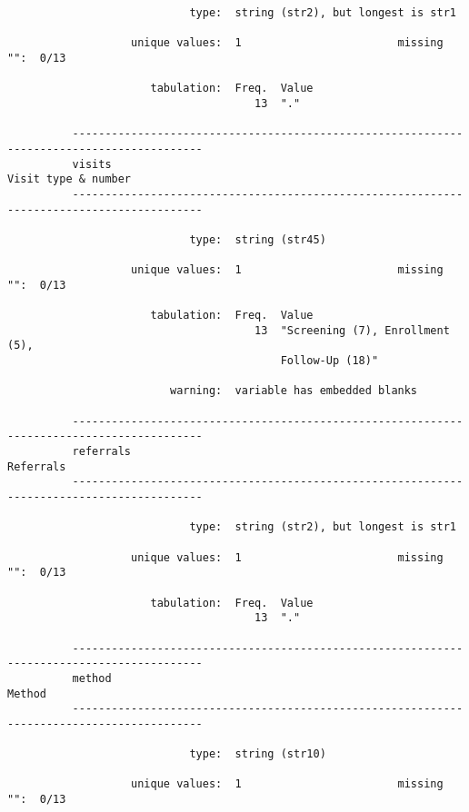 \documentclass{article}
\begin{document}
\begin{verbatim}
                            type:  string (str2), but longest is str1
          
                   unique values:  1                        missing "":  0/13
          
                      tabulation:  Freq.  Value
                                      13  "."
          
          ------------------------------------------------------------------------------------------
          visits                                                                 Visit type & number
          ------------------------------------------------------------------------------------------
          
                            type:  string (str45)
          
                   unique values:  1                        missing "":  0/13
          
                      tabulation:  Freq.  Value
                                      13  "Screening (7), Enrollment (5),
                                          Follow-Up (18)"
          
                         warning:  variable has embedded blanks
          
          ------------------------------------------------------------------------------------------
          referrals                                                                        Referrals
          ------------------------------------------------------------------------------------------
          
                            type:  string (str2), but longest is str1
          
                   unique values:  1                        missing "":  0/13
          
                      tabulation:  Freq.  Value
                                      13  "."
          
          ------------------------------------------------------------------------------------------
          method                                                                              Method
          ------------------------------------------------------------------------------------------
          
                            type:  string (str10)
          
                   unique values:  1                        missing "":  0/13
          

\end{verbatim}
\end{document}
